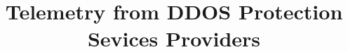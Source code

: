 \documentclass[letterpaper,twocolumn,10pt]{article}
\begin{document}

\date{}

\title{\Large \bf Telemetry from DDOS Protection Sevices Providers}

\author{} %

\maketitle






\end{document}
